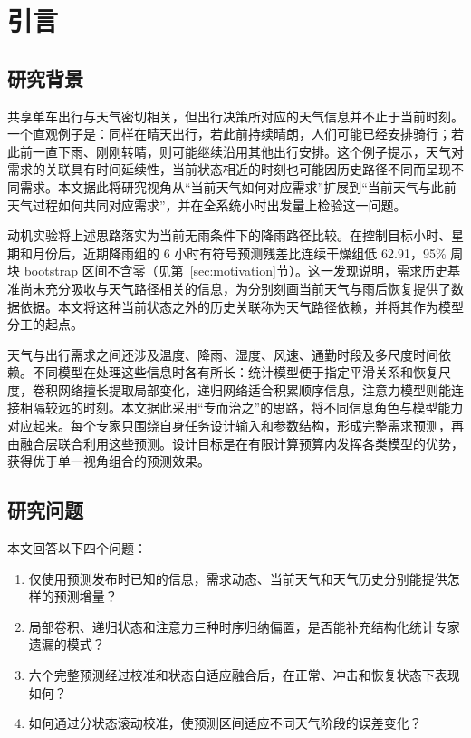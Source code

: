 \documentclass[UTF8,11pt,a4paper]{ctexart}
\begin{document}
\clearpage
\tableofcontents
\clearpage
\listoffigures
\clearpage
\listoftables
\clearpage


\section{引言}

\subsection{研究背景}

共享单车出行与天气密切相关，但出行决策所对应的天气信息并不止于当前时刻。一个直观例子是：同样在晴天出行，若此前持续晴朗，人们可能已经安排骑行；若此前一直下雨、刚刚转晴，则可能继续沿用其他出行安排。这个例子提示，天气对需求的关联具有时间延续性，当前状态相近的时刻也可能因历史路径不同而呈现不同需求。本文据此将研究视角从“当前天气如何对应需求”扩展到“当前天气与此前天气过程如何共同对应需求”，并在全系统小时出发量上检验这一问题。

动机实验将上述思路落实为当前无雨条件下的降雨路径比较。在控制目标小时、星期和月份后，近期降雨组的 6 小时有符号预测残差比连续干燥组低 62.91，95\% 周块 bootstrap 区间不含零（见第~\ref{sec:motivation}节）。这一发现说明，需求历史基准尚未充分吸收与天气路径相关的信息，为分别刻画当前天气与雨后恢复提供了数据依据。本文将这种当前状态之外的历史关联称为天气路径依赖，并将其作为模型分工的起点。

天气与出行需求之间还涉及温度、降雨、湿度、风速、通勤时段及多尺度时间依赖。不同模型在处理这些信息时各有所长：统计模型便于指定平滑关系和恢复尺度，卷积网络擅长提取局部变化，递归网络适合积累顺序信息，注意力模型则能连接相隔较远的时刻。本文据此采用“专而治之”的思路，将不同信息角色与模型能力对应起来。每个专家只围绕自身任务设计输入和参数结构，形成完整需求预测，再由融合层联合利用这些预测。设计目标是在有限计算预算内发挥各类模型的优势，获得优于单一视角组合的预测效果。

\subsection{研究问题}

本文回答以下四个问题：
\begin{enumerate}
  \item 仅使用预测发布时已知的信息，需求动态、当前天气和天气历史分别能提供怎样的预测增量？
  \item 局部卷积、递归状态和注意力三种时序归纳偏置，是否能补充结构化统计专家遗漏的模式？
  \item 六个完整预测经过校准和状态自适应融合后，在正常、冲击和恢复状态下表现如何？
  \item 如何通过分状态滚动校准，使预测区间适应不同天气阶段的误差变化？
\end{enumerate}
\end{document}
